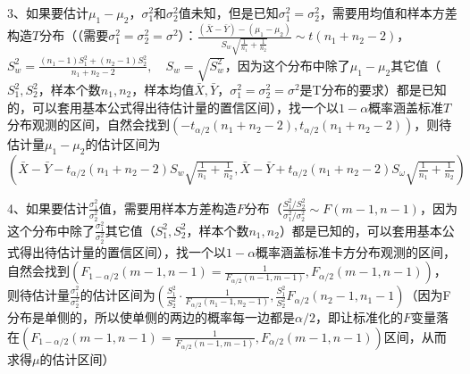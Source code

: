 3、如果要估计$\mu_1-\mu_2$，$\sigma_{1}^{2}$和$\sigma_{2}^{2}$值未知，但是已知$\sigma_{1}^{2}=\sigma_{2}^{2}$，需要用均值和样本方差构造$T$分布（（需要$\sigma_{1}^{2}=\sigma_{2}^{2}=\sigma^{2}$）：$\frac{(\bar{X}-\bar{Y})-\left(\mu_{1}-\mu_{2}\right)}{S_{w} \sqrt{\frac{1}{n_{1}}+\frac{1}{n_{2}}}} \sim t\left(n_{1}+n_{2}-2\right)$，$S_{w}^{2}=\frac{\left(n_{1}-1\right) S_{1}^{2}+\left(n_{2}-1\right) S_{2}^{2}}{n_{1}+n_{2}-2}, \quad S_{w}=\sqrt{S_{w}^{2}}$，因为这个分布中除了$\mu_{1}-\mu_{2}$其它值（$S_{1}^{2},S_{2}^{2}$，样本个数$n_1,n_2$，样本均值$\bar{X},\bar{Y}$，$\sigma_{1}^{2}=\sigma_{2}^{2}=\sigma^{2}$是T分布的要求）都是已知的，可以套用基本公式得出待估计量的置信区间），找一个以$1−α$概率涵盖标准$T$分布观测的区间，自然会找到$(−t_{\alpha/2}(n_{1}+n_{2}-2),t_{\alpha/2}(n_{1}+n_{2}-2))$，则待估计量$\mu_1-\mu_2$的估计区间为$\left(\bar{X}-\bar{Y}-t_{{\alpha}/{2}}\left(n_{1}+n_{2}-2\right) S_{w} \sqrt{\frac{1}{n_{1}}+\frac{1}{n_{2}}}\right. ,\left.\bar{X}-\bar{Y}+t_{{\alpha}/{2}}\left(n_{1}+n_{2}-2\right) S_{\omega} \sqrt{\frac{1}{n_{1}}+\frac{1}{n_{2}}}\right)$

4、如果要估计$\frac{\sigma_{1}^{2}}{\sigma_{2}^{2}}$值，需要用样本方差构造$F$分布（$\frac{S_{1}^{2} / S_{2}^{2}}{\sigma_{1}^{2} / \sigma_{2}^{2}} \sim F\left(m-1, n-1\right)$，因为这个分布中除了$\frac{\sigma_{1}^{2}}{\sigma_{2}^{2}}$其它值（$S_{1}^{2},S_{2}^{2}$，样本个数$n_1,n_2$）都是已知的，可以套用基本公式得出待估计量的置信区间），找一个以$1−α$概率涵盖标准卡方分布观测的区间，自然会找到$(F_{1-\alpha/2}(m−1,n−1)=\frac{1}{F_{{\alpha}/{2}}\left(n−1, m−1\right)},F_{\alpha/2}(m−1,n−1))$，则待估计量$\frac{\sigma_{1}^{2}}{\sigma_{2}^{2}}$的估计区间为$\left(\frac{S_{1}^{2}}{S_{2}^{2}} \cdot \frac{1}{F_{{\alpha}/{2}}\left(n_{1}-1, n_{2}-1\right)}, \frac{S_{1}^{2}}{S_{2}^{2}} F_{{\alpha}/{2}}\left(n_{2}-1, n_{1}-1\right.\right)$（因为F分布是单侧的，所以使单侧的两边的概率每一边都是$\alpha/2$，即让标准化的$F$变量落在$(F_{1-\alpha/2}(m−1,n−1)=\frac{1}{F_{{\alpha}/{2}}\left(n−1, m−1\right)},F_{\alpha/2}(m−1,n−1))$区间，从而求得$\mu$的估计区间）

